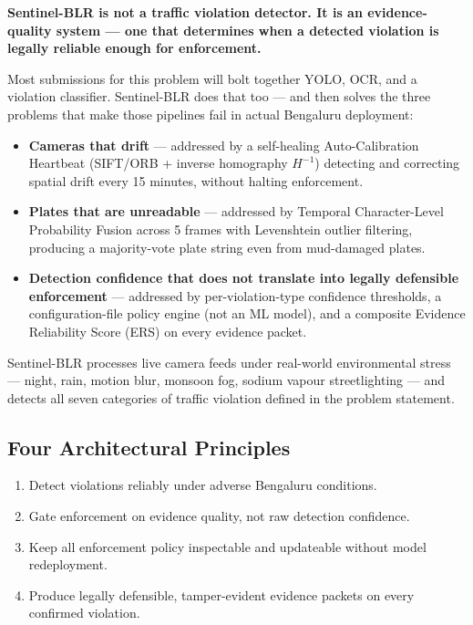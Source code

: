 \documentclass[11pt,a4paper]{article}
\begin{document}
\textbf{Sentinel-BLR is not a traffic violation detector. It is an evidence-quality system --- one that determines when a detected violation is legally reliable enough for enforcement.}

Most submissions for this problem will bolt together YOLO, OCR, and a violation classifier. Sentinel-BLR does that too --- and then solves the three problems that make those pipelines fail in actual Bengaluru deployment:

\begin{itemize}[leftmargin=1.8em, itemsep=0.3em]
    \item \textbf{Cameras that drift} --- addressed by a self-healing Auto-Calibration Heartbeat (SIFT/ORB + inverse homography $H^{-1}$) detecting and correcting spatial drift every 15 minutes, without halting enforcement.
    \item \textbf{Plates that are unreadable} --- addressed by Temporal Character-Level Probability Fusion across 5 frames with Levenshtein outlier filtering, producing a majority-vote plate string even from mud-damaged plates.
    \item \textbf{Detection confidence that does not translate into legally defensible enforcement} --- addressed by per-violation-type confidence thresholds, a configuration-file policy engine (not an ML model), and a composite Evidence Reliability Score (ERS) on every evidence packet.
\end{itemize}

Sentinel-BLR processes live camera feeds under real-world environmental stress --- night, rain, motion blur, monsoon fog, sodium vapour streetlighting --- and detects all seven categories of traffic violation defined in the problem statement.

\subsection*{Four Architectural Principles}
\begin{enumerate}[leftmargin=1.8em, itemsep=0.2em]
    \item Detect violations reliably under adverse Bengaluru conditions.
    \item Gate enforcement on evidence quality, not raw detection confidence.
    \item Keep all enforcement policy inspectable and updateable without model redeployment.
    \item Produce legally defensible, tamper-evident evidence packets on every confirmed violation.
\end{enumerate}
\end{document}
